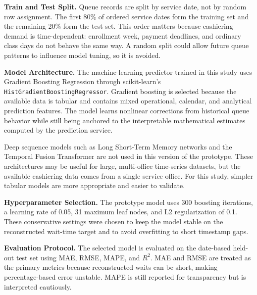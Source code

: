 \documentclass{research}
\begin{document}
\textbf{Train and Test Split.} Queue records are split by service date,
not by random row assignment. The first 80\% of ordered service dates
form the training set and the remaining 20\% form the test set. This
order matters because cashiering demand is time-dependent: enrollment
week, payment deadlines, and ordinary class days do not behave the same
way. A random split could allow future queue patterns to influence
model tuning, so it is avoided.

\textbf{Model Architecture.} The machine-learning predictor trained in
this study uses Gradient Boosting Regression through scikit-learn's
\texttt{HistGradientBoostingRegressor}. Gradient boosting is selected
because the available data is tabular and contains mixed operational,
calendar, and analytical prediction features. The model learns
nonlinear corrections from historical queue behavior while still being
anchored to the interpretable mathematical estimates computed by the
prediction service.

Deep sequence models such as Long Short-Term Memory networks and the
Temporal Fusion Transformer are not used in this version of the
prototype. These architectures may be useful for large, multi-office
time-series datasets, but the available cashiering data comes from a
single service office. For this study, simpler tabular models are more
appropriate and easier to validate.

\textbf{Hyperparameter Selection.} The prototype model uses 300
boosting iterations, a learning rate of 0.05, 31 maximum leaf nodes,
and L2 regularization of 0.1. These conservative settings were chosen
to keep the model stable on the reconstructed wait-time target and to
avoid overfitting to short timestamp gaps.

\textbf{Evaluation Protocol.} The selected model is evaluated on the
date-based held-out test set using MAE, RMSE, MAPE, and $R^2$. MAE and
RMSE are treated as the primary metrics because reconstructed waits can
be short, making percentage-based error unstable. MAPE is still
reported for transparency but is interpreted cautiously.
\end{document}
